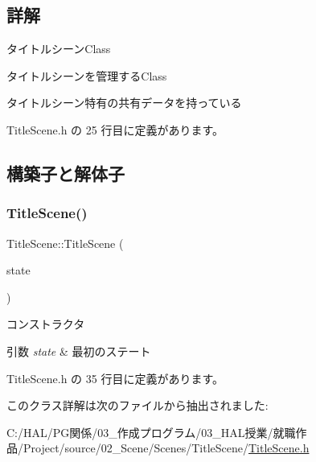 \subsection{詳解}
タイトルシーン\+Class 

タイトルシーンを管理する\+Class

タイトルシーン特有の共有データを持っている 

 Title\+Scene.\+h の 25 行目に定義があります。



\subsection{構築子と解体子}
\mbox{\label{class_title_scene_a433ef854689b1c9defb29d9f999c52da}} 
\subsubsection{\texorpdfstring{Title\+Scene()}{TitleScene()}}
{\footnotesize\ttfamily Title\+Scene\+::\+Title\+Scene (\begin{DoxyParamCaption}\item[{\mbox{\hyperlink{class_scene_base_1_1_state_base}{State\+Base}} $\ast$}]{state }\end{DoxyParamCaption})\hspace{0.3cm}{\ttfamily [inline]}}



コンストラクタ 


\begin{DoxyParams}{引数}
{\em state} & 最初のステート \\
\hline
\end{DoxyParams}


 Title\+Scene.\+h の 35 行目に定義があります。



このクラス詳解は次のファイルから抽出されました\+:\begin{DoxyCompactItemize}
\item 
C\+:/\+H\+A\+L/\+P\+G関係/03\+\_\+作成プログラム/03\+\_\+\+H\+A\+L授業/就職作品/\+Project/source/02\+\_\+\+Scene/\+Scenes/\+Title\+Scene/\mbox{\hyperlink{_title_scene_8h}{Title\+Scene.\+h}}\end{DoxyCompactItemize}

